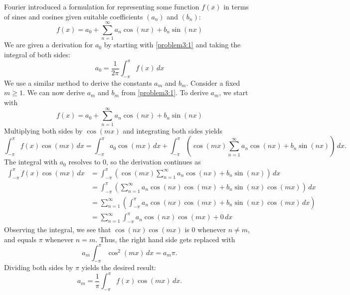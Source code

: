 \begin{problem}
\label{exercise3}
    Fourier introduced a formulation for representing some function $f(x)$ in terms of sines and cosines given suitable coefficients $(a_n)$ and $(b_n)$: 
    \begin{equation}
    \label{problem3:1}
        f(x) = a_0 + \sum_{n=1}^{\infty} a_n \cos(nx) + b_n \sin(nx)
    \end{equation}
    We are given a derivation for $a_0$ by starting with \cref{problem3:1} and taking the integral of both sides:
    \begin{equation}
        a_0 = \frac{1}{2\pi} \int_{-\pi}^{\pi}f(x) \, dx
    \end{equation}
    We use a similar method to derive the constants $a_m$ and $b_m$. Consider a fixed $m \geq 1$. We can now derive $a_m$ and $b_m$ from \cref{problem3:1}.
    To derive $a_m$, we start with
    \begin{equation}
        f(x) = a_0 + \sum_{n=1}^{\infty} a_n \cos(nx) + b_n \sin(nx) 
    \end{equation}
    Multiplying both sides by $\cos(mx)$ and integrating both sides yields
    \begin{equation}
        \int_{-\pi}^{\pi} f(x) \cos(mx) \, dx = \int_{-\pi}^{\pi} a_0 \cos(mx) \, dx + \int_{-\pi}^{\pi} \left( \cos(mx) \sum_{n=1}^{\infty} a_n \cos(nx) + b_n \sin(nx) \right) \, dx. 
    \end{equation}
    The integral with $a_0$ resolves to 0, so the derivation continues as
    \begin{align*}
        \int_{-\pi}^{\pi} f(x) \cos(mx) \, dx &= \int_{-\pi}^{\pi} \left( \cos(mx) \sum_{n=1}^{\infty} a_n \cos(nx) + b_n \sin(nx) \right) \, dx \\
        &= \int_{-\pi}^{\pi} \left( \sum_{n=1}^{\infty} a_n \cos(nx) \cos(mx) + b_n \sin(nx) \cos(mx) \right) \, dx \\
        &= \sum_{n=1}^{\infty} \left( \int_{-\pi}^{\pi} a_n \cos(nx) \cos(mx) + b_n \sin(nx) \cos(mx) \, dx \right) \\
        &= \sum_{n=1}^{\infty} \int_{-\pi}^{\pi} a_n \cos(nx) \cos(mx) + 0 \, dx
    \end{align*}
    Observing the integral, we see that $\cos(nx)\cos(mx)$ is 0 whenever $n \neq m$, and equals $\pi$ whenever $n=m$. Thus, the right hand side gets replaced with 
    \begin{equation}
        a_m \int_{-\pi}^{\pi} \cos^2(mx) \, dx = a_m \pi.
    \end{equation}
    Dividing both sides by $\pi$ yields the desired result:
    \begin{equation}
        a_m = \frac{1}{\pi} \int_{-\pi}^{\pi} f(x) \cos(mx) \, dx.
    \end{equation}


\end{problem}
